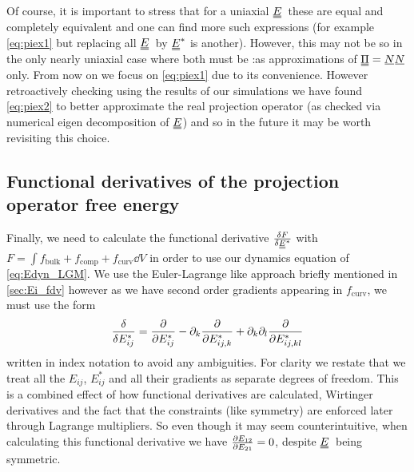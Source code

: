 \documentclass[12pt]{article}
\newcommand{\suf}[2]{\stackunder[0.5pt]{\stackunder[1pt]{\ensuremath{#1}}{\rule{\widthof{\ensuremath{#2}}*\real{0.9}}{.1ex}}}{}}
\newcommand{\duf}[2]{\stackunder[0.5pt]{\stackunder[0.8pt]{\stackunder[1pt]{\ensuremath{#1}}{\rule{\widthof{\ensuremath{#2}}*\real{0.9}}{.1ex}}}{\rule{\widthof{\ensuremath{#2}}*\real{0.9}}{.1ex}}}{}}
\newcommand{\su}[1]{\suf{#1}{#1}}
\newcommand{\du}[1]{\duf{#1}{#1}}
\newcommand{\sdu}[1]{\scriptsize\du{#1}\normalsize}
\newcommand{\pp}{\ensuremath{\partial}}
\newcommand{\NN}{\ensuremath{\su{N}}}
\newcommand{\EE}{\ensuremath{\du{E}}}
\newcommand{\PP}{\ensuremath{\du{\Pi}}}
\newcommand{\FB}{\ensuremath{f_\text{bulk}}}
\newcommand{\FC}{\ensuremath{f_\text{comp}}}
\newcommand{\FU}{\ensuremath{f_\text{curv}}}
\begin{document}
        Of course, it is important to stress that for a uniaxial \EE\ these are equal and completely equivalent and one can find more such expressions (for example \cref{eq:piex1} but replacing all \EE\ by $\EE^*$ is another).
        However, this may not be so in the only nearly uniaxial case where both must be :as approximations of $\PP=\NN\NN$ only.
        From now on we focus on \cref{eq:piex1} due to its convenience.
        However retroactively checking using the results of our simulations we have found \cref{eq:piex2} to better approximate the real projection operator (as checked via numerical eigen decomposition of \EE) and so in the future it may be worth revisiting this choice.

    \subsection{Functional derivatives of the projection operator free energy}
        Finally, we need to calculate the functional derivative $\fdv{F}{\sdu{E}^*}$ with $F=\int \FB + \FC + \FU \dd{V}$ in order to use our dynamics equation of \cref{eq:Edyn_LGM}.
        We use the Euler-Lagrange like approach briefly mentioned in \cref{sec:Ei_fdv} however as we have second order gradients appearing in \FU, we must use the form
        \begin{equation}
            \fdv{E_{ij}^*} = \pdv{E_{ij}^*} - \pp_k \pdv{E_{ij,k}^*} + \pp_k\pp_l \pdv{E_{ij,kl}^*}
        \end{equation}
        written in index notation to avoid any ambiguities.
        For clarity we restate that we treat all the $E_{ij}$, $E_{ij}^*$ and all their gradients as separate degrees of freedom.
        This is a combined effect of how functional derivatives are calculated, Wirtinger derivatives and the fact that the constraints (like symmetry) are enforced later through Lagrange multipliers.
        So even though it may seem counterintuitive, when calculating this functional derivative we have $\pdv{E_{12}}{E_{21}}=0$, despite \EE\ being symmetric.
\end{document}
